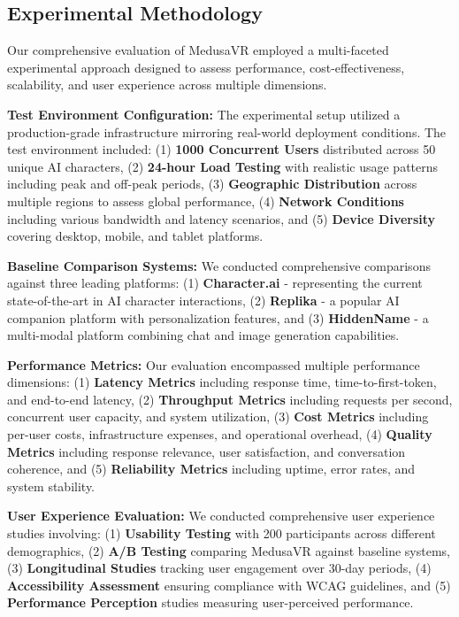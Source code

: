\documentclass[conference]{IEEEtran}
\begin{document}
\subsection{Experimental Methodology}
Our comprehensive evaluation of MedusaVR employed a multi-faceted experimental approach designed to assess performance, cost-effectiveness, scalability, and user experience across multiple dimensions.

\textbf{Test Environment Configuration:} The experimental setup utilized a production-grade infrastructure mirroring real-world deployment conditions. The test environment included: (1) \textbf{1000 Concurrent Users} distributed across 50 unique AI characters, (2) \textbf{24-hour Load Testing} with realistic usage patterns including peak and off-peak periods, (3) \textbf{Geographic Distribution} across multiple regions to assess global performance, (4) \textbf{Network Conditions} including various bandwidth and latency scenarios, and (5) \textbf{Device Diversity} covering desktop, mobile, and tablet platforms.

\textbf{Baseline Comparison Systems:} We conducted comprehensive comparisons against three leading platforms: (1) \textbf{Character.ai} - representing the current state-of-the-art in AI character interactions, (2) \textbf{Replika} - a popular AI companion platform with personalization features, and (3) \textbf{HiddenName} - a multi-modal platform combining chat and image generation capabilities.

\textbf{Performance Metrics:} Our evaluation encompassed multiple performance dimensions: (1) \textbf{Latency Metrics} including response time, time-to-first-token, and end-to-end latency, (2) \textbf{Throughput Metrics} including requests per second, concurrent user capacity, and system utilization, (3) \textbf{Cost Metrics} including per-user costs, infrastructure expenses, and operational overhead, (4) \textbf{Quality Metrics} including response relevance, user satisfaction, and conversation coherence, and (5) \textbf{Reliability Metrics} including uptime, error rates, and system stability.

\textbf{User Experience Evaluation:} We conducted comprehensive user experience studies involving: (1) \textbf{Usability Testing} with 200 participants across different demographics, (2) \textbf{A/B Testing} comparing MedusaVR against baseline systems, (3) \textbf{Longitudinal Studies} tracking user engagement over 30-day periods, (4) \textbf{Accessibility Assessment} ensuring compliance with WCAG guidelines, and (5) \textbf{Performance Perception} studies measuring user-perceived performance.
\end{document}

